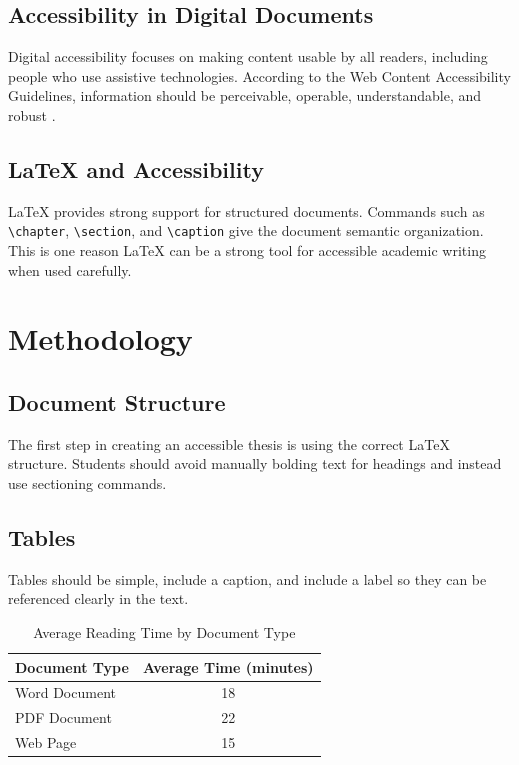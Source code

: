 \documentclass[12pt]{report}
\begin{document}
\section{Accessibility in Digital Documents} 
 
Digital accessibility focuses on making content usable by all readers, including people who use assistive technologies. According to the Web Content Accessibility Guidelines, information should be perceivable, operable, understandable, and robust \cite{wcag21}. 
 
\section{LaTeX and Accessibility} 
 
LaTeX provides strong support for structured documents. Commands such as \verb|\chapter|, \verb|\section|, and \verb|\caption| give the document semantic organization. This is one reason LaTeX can be a strong tool for accessible academic writing when used carefully. 
 
\chapter{Methodology} 
\section{Document Structure} 
 
The first step in creating an accessible thesis is using the correct LaTeX structure. Students should avoid manually bolding text for headings and instead use sectioning commands. 
 
\section{Tables} 
 
Tables should be simple, include a caption, and include a label so they can be referenced clearly in the text. 
 
\begin{table}[H] 
\centering 
\caption{Average Reading Time by Document Type} 
\label{tab:readingtime} 
\begin{tabular}{lc} 
\toprule 
Document Type & Average Time (minutes) \\ 
\midrule 
Word Document & 18 \\ 
PDF Document  & 22 \\ 
Web Page      & 15 \\ 
\bottomrule 
\end{tabular} 
\end{table} 
 
\end{document}
